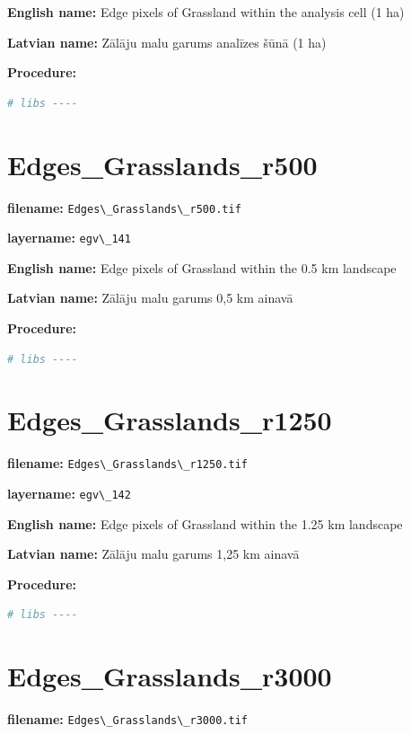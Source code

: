 \documentclass[
]{book}
\newcommand{\passthrough}[1]{#1}
\begin{document}
\textbf{English name:} Edge pixels of Grassland within the analysis cell (1 ha)

\textbf{Latvian name:} Zālāju malu garums analīzes šūnā (1 ha)

\textbf{Procedure:}

\begin{lstlisting}[language=R]
# libs ----
\end{lstlisting}

\section{Edges\_Grasslands\_r500}\label{ch06.141}

\textbf{filename:} \passthrough{\lstinline!Edges\_Grasslands\_r500.tif!}

\textbf{layername:} \passthrough{\lstinline!egv\_141!}

\textbf{English name:} Edge pixels of Grassland within the 0.5 km landscape

\textbf{Latvian name:} Zālāju malu garums 0,5 km ainavā

\textbf{Procedure:}

\begin{lstlisting}[language=R]
# libs ----
\end{lstlisting}

\section{Edges\_Grasslands\_r1250}\label{ch06.142}

\textbf{filename:} \passthrough{\lstinline!Edges\_Grasslands\_r1250.tif!}

\textbf{layername:} \passthrough{\lstinline!egv\_142!}

\textbf{English name:} Edge pixels of Grassland within the 1.25 km landscape

\textbf{Latvian name:} Zālāju malu garums 1,25 km ainavā

\textbf{Procedure:}

\begin{lstlisting}[language=R]
# libs ----
\end{lstlisting}

\section{Edges\_Grasslands\_r3000}\label{ch06.143}

\textbf{filename:} \passthrough{\lstinline!Edges\_Grasslands\_r3000.tif!}
\end{document}

